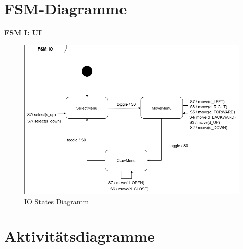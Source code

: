 \clearpage
\section{FSM-Diagramme}

\textbf{FSM I: UI}\\
\begin{figure}[h]  
    \centering
    \includegraphics[width=0.8\linewidth]{diagrams/FSM_IO.drawio.png}
    \caption{IO States Diagramm}
    \label{fig:IO_States_Diagramm}
\end{figure}

\clearpage 
\section{Aktivitätsdiagramme}









